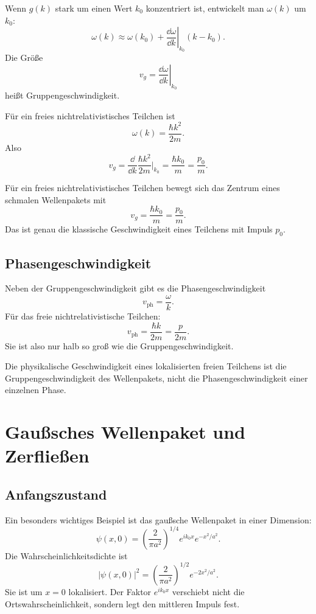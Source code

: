 Wenn $g(k)$ stark um einen Wert $k_0$ konzentriert ist, entwickelt man $\omega(k)$ um $k_0$:
\[
    \omega(k)\approx \omega(k_0)+\left.\frac{\dd\omega}{\dd k}\right|_{k_0}(k-k_0).
\]
Die Größe
\[
    v_g=\left.\frac{\dd\omega}{\dd k}\right|_{k_0}
\]
heißt Gruppengeschwindigkeit.

Für ein freies nichtrelativistisches Teilchen ist
\[
    \omega(k)=\frac{\hbar k^2}{2m}.
\]
Also
\[
    v_g=\frac{\dd}{\dd k}\frac{\hbar k^2}{2m}\bigg|_{k_0}
    =\frac{\hbar k_0}{m}
    =\frac{p_0}{m}.
\]

\begin{formulabox}
Für ein freies nichtrelativistisches Teilchen bewegt sich das Zentrum eines schmalen Wellenpakets mit
\[
    v_g=\frac{\hbar k_0}{m}=\frac{p_0}{m}.
\]
Das ist genau die klassische Geschwindigkeit eines Teilchens mit Impuls $p_0$.
\end{formulabox}

\subsection{Phasengeschwindigkeit}

Neben der Gruppengeschwindigkeit gibt es die Phasengeschwindigkeit
\[
    v_{\mathrm{ph}}=\frac{\omega}{k}.
\]
Für das freie nichtrelativistische Teilchen:
\[
    v_{\mathrm{ph}}=\frac{\hbar k}{2m}=\frac{p}{2m}.
\]
Sie ist also nur halb so groß wie die Gruppengeschwindigkeit.

\begin{notebox}
Die physikalische Geschwindigkeit eines lokalisierten freien Teilchens ist die Gruppengeschwindigkeit des Wellenpakets, nicht die Phasengeschwindigkeit einer einzelnen Phase.
\end{notebox}

\section{Gaußsches Wellenpaket und Zerfließen}

\subsection{Anfangszustand}

Ein besonders wichtiges Beispiel ist das gaußsche Wellenpaket in einer Dimension:
\[
    \psi(x,0)
    =\left(\frac{2}{\pi a^2}\right)^{1/4}
      e^{ik_0x}e^{-x^2/a^2}.
\]
Die Wahrscheinlichkeitsdichte ist
\[
    |\psi(x,0)|^2
    =\left(\frac{2}{\pi a^2}\right)^{1/2}e^{-2x^2/a^2}.
\]
Sie ist um $x=0$ lokalisiert. Der Faktor $e^{ik_0x}$ verschiebt nicht die Ortswahrscheinlichkeit, sondern legt den mittleren Impuls fest.

